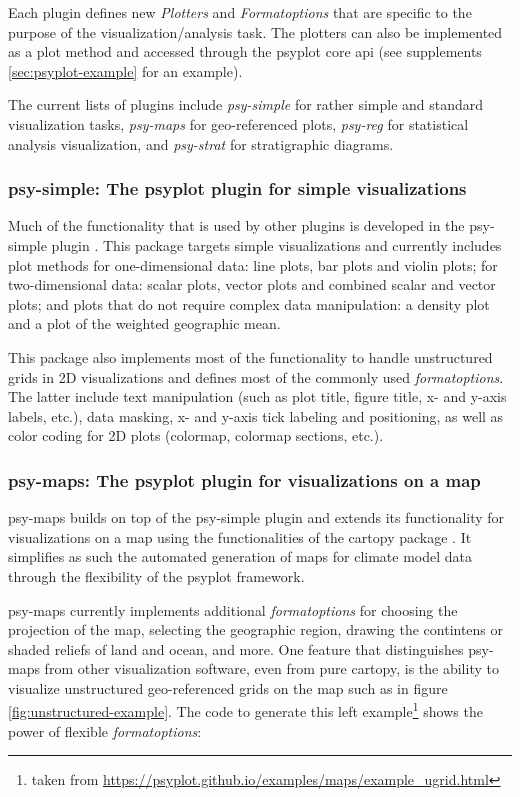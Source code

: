 \documentclass[
11pt, %
english, %
singlespacing, %
headsepline, %
]{article} %
\begin{document}
\begin{refsection}
Each plugin defines new \textit{Plotters} and \textit{Formatoptions} that are specific to the purpose of the visualization/analysis task. The plotters can also be implemented as a plot method and accessed through the psyplot core \gls{api} (see supplements \ref{sec:psyplot-example} for an example).

The current lists of plugins include \textit{psy-simple} for rather simple and standard visualization tasks, \textit{psy-maps} for geo-referenced plots, \textit{psy-reg} for statistical analysis visualization, and \textit{psy-strat} \citep{Sommer2019} for stratigraphic diagrams.

\subsubsection{psy-simple: The psyplot plugin for simple visualizations}

Much of the functionality that is used by other plugins is developed in the psy-simple plugin \citep{Sommer2017b}. This package targets simple visualizations and currently includes plot methods for one-dimensional data: line plots, bar plots and violin plots; for two-dimensional data: scalar plots, vector plots and combined scalar and vector plots; and plots that do not require complex data manipulation: a density plot and a plot of the weighted geographic mean.

This package also implements most of the functionality to handle unstructured grids in 2D visualizations and defines most of the commonly used \textit{formatoptions}. The latter include text manipulation (such as plot title, figure title, x- and y-axis labels, etc.), data masking, x- and y-axis tick labeling and positioning, as well as color coding for 2D plots (colormap, colormap sections, etc.).

\subsubsection{psy-maps: The psyplot plugin for visualizations on a map} \label{sec:psy-maps}

psy-maps \citep{Sommer2017c} builds on top of the psy-simple plugin and extends its functionality for visualizations on a map using the functionalities of the cartopy package \citep{Cartopy}. It simplifies as such the automated generation of maps for climate model data through the flexibility of the psyplot framework.

psy-maps currently implements additional \textit{formatoptions} for choosing the projection of the map, selecting the geographic region, drawing the contintens or shaded reliefs of land and ocean, and more. One feature that distinguishes psy-maps from other visualization software, even from pure cartopy, is the ability to visualize unstructured geo-referenced grids on the map such as in figure \ref{fig:unstructured-example}. The code to generate this left example\footnote{taken from \url{https://psyplot.github.io/examples/maps/example_ugrid.html}} shows the power of flexible \textit{formatoptions}:


\end{refsection}
\end{document}
